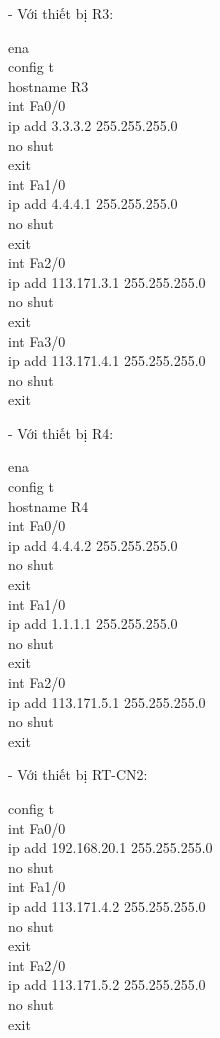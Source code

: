 \documentclass[12pt, a4paper]{article}
\begin{document}
\begin{flushleft}
		\newpage
		- Với thiết bị R3:
		\begin{tcolorbox}
			ena\\
			config t\\
			hostname R3\\
			int Fa0/0\\
			ip add 3.3.3.2 255.255.255.0\\
			no shut\\
			exit\\
			int Fa1/0\\
			ip add 4.4.4.1 255.255.255.0\\
			no shut\\
			exit\\
			int Fa2/0\\
			ip add 113.171.3.1 255.255.255.0\\
			no shut\\
			exit\\
			int Fa3/0\\
			ip add 113.171.4.1 255.255.255.0\\
			no shut\\
			exit
		\end{tcolorbox}
		
		\newpage
		- Với thiết bị R4:
		\begin{tcolorbox}
			ena\\
			config t\\
			hostname R4\\
			int Fa0/0\\
			ip add 4.4.4.2 255.255.255.0\\
			no shut\\
			exit\\
			int Fa1/0\\
			ip add 1.1.1.1 255.255.255.0\\
			no shut\\
			exit\\
			int Fa2/0\\
			ip add 113.171.5.1 255.255.255.0\\
			no shut\\
			exit
		\end{tcolorbox}
		
		\newpage
		- Với thiết bị RT-CN2:
		\begin{tcolorbox}
			config t\\
			int Fa0/0\\
			ip add 192.168.20.1 255.255.255.0\\
			no shut\\
			int Fa1/0\\
			ip add 113.171.4.2 255.255.255.0\\
			no shut\\
			exit\\
			int Fa2/0\\
			ip add 113.171.5.2 255.255.255.0\\
			no shut\\
			exit
		\end{tcolorbox}
		

\end{flushleft}
\end{document}
